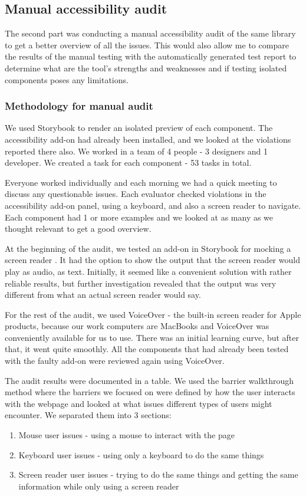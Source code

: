 \documentclass{master_thesis}
\begin{document}
\subsection{Manual accessibility audit}

The second part was conducting a manual accessibility audit of the same library to get a better overview of all the issues. This would also allow me to compare the results of the manual testing with the automatically generated test report to determine what are the tool's strengths and weaknesses and if testing isolated components poses any limitations.

\subsubsection{Methodology for manual audit}
We used Storybook to render an isolated preview of each component.
The accessibility add-on had already been installed, and we looked at the violations reported there also. We worked in a team of 4 people - 3 designers and 1 developer. We created a task for each component - 53 tasks in total.

Everyone worked individually and each morning we had a quick meeting to discuss any questionable issues. Each evaluator checked violations in the accessibility add-on panel, using a keyboard, and also a screen reader to navigate. Each component had 1 or more examples and we looked at as many as we thought relevant to get a good overview.

At the beginning of the audit, we tested an add-on in Storybook for mocking a screen reader \citep{Lara}. It had the option to show the output that the screen reader would play as audio, as text. Initially, it seemed like a convenient solution with rather reliable results, but further investigation revealed that the output was very different from what an actual screen reader would say.

For the rest of the audit, we used VoiceOver - the built-in screen reader for Apple products, because our work computers are MacBooks and VoiceOver was conveniently available for us to use. There was an initial learning curve, but after that, it went quite smoothly. All the components that had already been tested with the faulty add-on were reviewed again using VoiceOver.

The audit results were documented in a table. We used the barrier walkthrough method where the barriers we focused on were defined by how the user interacts with the webpage and looked at what issues different types of users might encounter. We separated them into 3 sections:
\begin{enumerate}
	\item Mouse user issues - using a mouse to interact with the page
	\item Keyboard user issues - using only a keyboard to do the same things
	\item Screen reader user issues - trying to do the same things and getting the same information while only using a screen reader
\end{enumerate}
\end{document}
